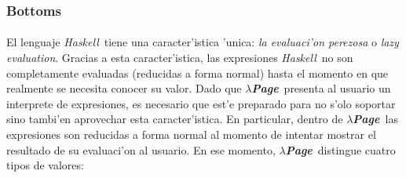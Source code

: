\documentclass[a4paper]{article}
\newcommand{\haskell}{\textsl{Haskell}}
\newcommand{\hpage}{\textbf{\textsl{$\lambda$Page}}}
\begin{document}
\subsubsection{Bottoms}
\paragraph{}El lenguaje \haskell\ tiene una caracter'istica 'unica: \textsl{la evaluaci'on perezosa} o \textsl{lazy evaluation}.  Gracias a esta caracter'istica, las expresiones \haskell\ no son completamente evaluadas (reducidas a forma normal) hasta el momento en que realmente se necesita conocer su valor.  Dado que \hpage\ presenta al usuario un interprete de expresiones, es necesario que est'e preparado para no s'olo soportar sino tambi'en aprovechar esta caracter'istica.  En particular, dentro de \hpage\ las expresiones son reducidas a forma normal al momento de intentar mostrar el resultado de su evaluaci'on al usuario.  En ese momento, \hpage\ distingue cuatro tipos de valores:
\end{document}

